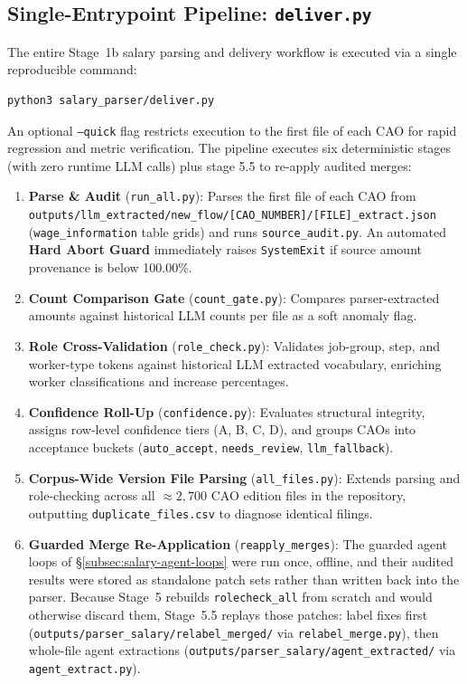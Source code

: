 \subsection{Single-Entrypoint Pipeline: \texttt{deliver.py}}
\label{subsec:salary-deliver}

The entire Stage~1b salary parsing and delivery workflow is executed via a single reproducible command:
\begin{verbatim}
python3 salary_parser/deliver.py
\end{verbatim}
An optional \texttt{--quick} flag restricts execution to the first file of each CAO for rapid regression and metric verification. The pipeline executes six deterministic stages (with zero runtime LLM calls) plus stage 5.5 to re-apply audited merges:
\begin{enumerate}[leftmargin=1.8em]
  \item \textbf{Parse \& Audit} (\texttt{run\_all.py}): Parses the first file of each CAO from \nolinkurl{outputs/llm_extracted/new_flow/[CAO_NUMBER]/[FILE]_extract.json} (\texttt{wage\_information} table grids) and runs \nolinkurl{source_audit.py}. An automated \textbf{Hard Abort Guard} immediately raises \texttt{SystemExit} if source amount provenance is below 100.00\%.
  \item \textbf{Count Comparison Gate} (\texttt{count\_gate.py}): Compares parser-extracted amounts against historical LLM counts per file as a soft anomaly flag.
  \item \textbf{Role Cross-Validation} (\texttt{role\_check.py}): Validates job-group, step, and worker-type tokens against historical LLM extracted vocabulary, enriching worker classifications and increase percentages.
  \item \textbf{Confidence Roll-Up} (\texttt{confidence.py}): Evaluates structural integrity, assigns row-level confidence tiers (A, B, C, D), and groups CAOs into acceptance buckets (\texttt{auto\_accept}, \texttt{needs\_review}, \texttt{llm\_fallback}).
  \item \textbf{Corpus-Wide Version File Parsing} (\texttt{all\_files.py}): Extends parsing and role-checking across all $\approx 2,700$ CAO edition files in the repository, outputting \nolinkurl{duplicate_files.csv} to diagnose identical filings.
  \item \textbf{Guarded Merge Re-Application} (\texttt{reapply\_merges}): The guarded agent loops of \S\ref{subsec:salary-agent-loops} were run once, offline, and their audited results were stored as standalone patch sets rather than written back into the parser. Because Stage~5 rebuilds \nolinkurl{rolecheck_all} from scratch and would otherwise discard them, Stage~5.5 replays those patches: label fixes first (\nolinkurl{outputs/parser_salary/relabel_merged/} via \nolinkurl{relabel_merge.py}), then whole-file agent extractions (\nolinkurl{outputs/parser_salary/agent_extracted/} via \nolinkurl{agent_extract.py}).

\end{enumerate}
